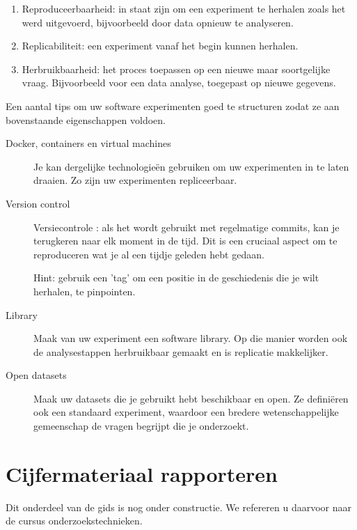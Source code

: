 \begin{enumerate}
	\item Reproduceerbaarheid: in staat zijn om een ​​experiment te herhalen zoals het werd uitgevoerd, bijvoorbeeld door data opnieuw te analyseren.
	\item Replicabiliteit: een experiment vanaf het begin kunnen herhalen.
	\item Herbruikbaarheid: het proces toepassen op een nieuwe maar soortgelijke vraag. Bijvoorbeeld voor een data analyse, toegepast op nieuwe gegevens.
\end{enumerate}

Een aantal tips om uw software experimenten goed te structuren zodat ze aan bovenstaande eigenschappen voldoen.

\begin{description}
	\item[Docker, containers en virtual machines] Je kan dergelijke technologieën gebruiken om uw experimenten in te laten draaien. Zo zijn uw experimenten repliceerbaar.
	\item[Version control] Versiecontrole : als het wordt gebruikt met regelmatige commits, kan je terugkeren naar elk moment in de tijd. Dit is een cruciaal aspect  om te reproduceren wat je al een tijdje geleden hebt gedaan.
	
	Hint: gebruik een 'tag' om een ​​positie in de geschiedenis die je wilt herhalen, te pinpointen.
	\item[Library] Maak van uw experiment een software library. Op die manier worden ook de analysestappen herbruikbaar gemaakt en is replicatie makkelijker. 
	\item[Open datasets] Maak uw datasets die je gebruikt hebt beschikbaar en open. Ze definiëren ook een standaard experiment, waardoor een bredere wetenschappelijke gemeenschap de vragen begrijpt die je onderzoekt.
\end{description}



\section{Cijfermateriaal rapporteren}
\label{sec:cijfermateriaal}
Dit onderdeel van de gids is nog onder constructie. We refereren u daarvoor naar de cursus onderzoekstechnieken.


